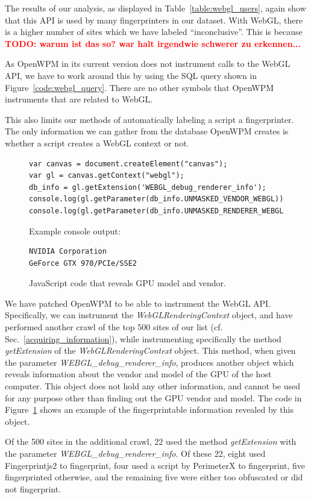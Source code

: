 \documentclass[
    fontsize=12pt,
    headings=small,
    parskip=half,
    bibliography=totoc,
    numbers=noenddot,
    open=any
    ]{scrreprt}
\newcommand{\todo}[1]{\textcolor{red}{\textbf{TODO: #1}}}
\begin{document}
The results of our analysis, as displayed in Table~\ref{table:webgl_users}, again show that this
API is used by many fingerprinters in our dataset.
With WebGL, there is a higher number of sites which we have labeled ``inconclusive''.
This is because \todo{warum ist das so? war halt irgendwie schwerer zu erkennen...}

As OpenWPM in its current version does not instrument calls to the WebGL API, we have to
work around this by using the SQL query shown in Figure~\ref{code:webgl_query}.
There are no other symbols that OpenWPM instruments that are related to WebGL.

This also limits our methods of automatically labeling a script a fingerprinter.
The only information we can gather from the database OpenWPM creates
is whether a script creates a WebGL context or not.

\begin{figure}
\begin{verbatim}
var canvas = document.createElement("canvas");
var gl = canvas.getContext("webgl");
db_info = gl.getExtension('WEBGL_debug_renderer_info');
console.log(gl.getParameter(db_info.UNMASKED_VENDOR_WEBGL));
console.log(gl.getParameter(db_info.UNMASKED_RENDERER_WEBGL));
\end{verbatim}
\null %
Example console output:
\begin{verbatim}
NVIDIA Corporation
GeForce GTX 970/PCIe/SSE2
\end{verbatim}
\caption{JavaScript code that reveals GPU model and vendor.}
\label{code:gpu_vendor}
\end{figure}

We have patched OpenWPM to be able to instrument the WebGL API.
Specifically, we can instrument the \textit{WebGLRenderingContext}
object, and have performed another crawl of the top 500 sites of our list (cf. Sec.~\ref{acquiring_information}),
while instrumenting specifically the method \textit{getExtension} of the \textit{WebGLRenderingContext} object.
This method, when given the parameter \textit{WEBGL\_debug\_renderer\_info}, produces another object
which reveals information about the vendor and model of the GPU of the host computer.
This object does not hold any other information, and cannot be used for any purpose other than
finding out the GPU vendor and model.
The code in Figure~\ref{code:gpu_vendor} shows an example of the fingerprintable information
revealed by this object.

Of the 500 sites in the additional crawl, 22 used the method \textit{getExtension} with the parameter
\textit{WEBGL\_debug\_renderer\_info}. Of these 22, eight used Fingerprintjs2 to fingerprint, four
used a script by PerimeterX to fingerprint, five fingerprinted otherwise, and the remaining five
were either too obfuscated or did not fingerprint.
\end{document}
